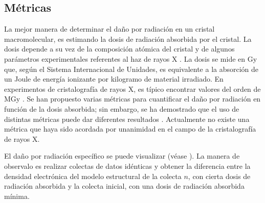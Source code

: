 \subsection{Métricas}
La mejor manera de determinar el daño por radiación en un cristal macromolecular, es estimando la dosis de radiación absorbida por el cristal. La dosis depende a su vez de la composición atómica del cristal y de algunos parámetros experimentales referentes al haz de rayos X . La dosis se mide en \si{\gray} que, según el Sistema Internacional de Unidades, es equivalente a la absorción de un Joule de energía ionizante por kilogramo de material irradiado. En experimentos de cristalografía de rayos X, es típico encontrar valores del orden de \si{\mega\gray} . Se han propuesto varias métricas para cuantificar el daño por radiación en función de la dosis absorbida; sin embargo, se ha demostrado que el uso de distintas métricas puede dar diferentes resultados . Actualmente no existe una métrica que haya sido acordada por unanimidad en el campo de la cristalografía de rayos X. 

El daño por radiación específico se puede visualizar (véase ). La manera de observalo es realizar colectas de datos idénticas y obtener la diferencia entre la densidad electrónica del modelo estructural de la colecta $n$, con cierta dosis de radiación absorbida y la colecta inicial, con una dosis de radiación absorbida mínima.

